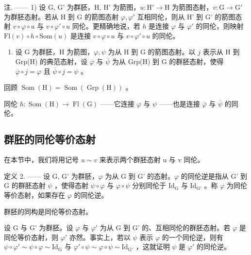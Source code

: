注. —— 1) 设 G, G' 为群胚，H, H' 为箭图，\(u\colon\mathrm{H}'\to\mathrm{H}\) 为箭图态射，\(v\colon\mathrm{G}\to\mathrm{G}'\) 为群胚态射。若从 H 到 G 的箭图态射 \(\varphi,\varphi'\) 互相同伦，则从 H' 到 G' 的箭图态射 \(v\circ\varphi\circ u\) 与 \(v\circ\varphi'\circ u\) 同伦。更精确地说，若 \(h\) 是连接 \(\varphi\) 与 \(\varphi'\) 的同伦，则映射 \(\mathrm{Fl}(v)\circ h\circ\mathrm{Som}(u)\) 是连接 \(v\circ\varphi\circ u\) 与 \(v\circ\varphi'\circ u\) 的同伦。

\begin{enumerate}
\def\labelenumi{\arabic{enumi})}
\setcounter{enumi}{1}
\tightlist
\item
  设 G 为群胚，H 为箭图，\(\varphi, \psi\) 为从 H 到 G 的箭图态射。以 \(j\) 表示从 H 到 Grp(H) 的典范态射，设 \(\overline{\varphi}\) 与 \(\overline{\psi}\) 为从 Grp(H) 到 G 的群胚态射，使得 \(\overline{\varphi} \circ j = \varphi\) 且 \(\overline{\psi} \circ j = \psi\) 。
\end{enumerate}

回顾 \(\operatorname{Som}(\mathrm{H}) = \operatorname{Som}(\operatorname{Grp}(\mathrm{H}))\) 。

同伦 \(h\colon \operatorname{Som}(\mathrm{H})\to \operatorname{Fl}(\mathrm{G})\) ——它连接 \(\varphi\) 与 \(\psi\) ——也是连接 \(\overline{\varphi}\) 与 \(\overline{\psi}\) 的同伦。

\subsection{群胚的同伦等价态射}

在本节中，我们将用记号 \(u \sim v\) 来表示两个群胚态射 u 与 v 同伦。

定义 2. —— 设 G, G' 为群胚，\(\varphi\) 为从 G 到 G' 的态射。\(\varphi\) 的同伦逆是指从 G' 到 G 的群胚态射 \(\psi\) ，使得态射 \(\psi \circ \varphi\) 与 \(\varphi \circ \psi\) 分别同伦于 \(\mathrm{Id}_{\mathrm{G}}\) 与 \(\mathrm{Id}_{\mathrm{G}'}\) 。称 \(\varphi\) 为同伦等价态射，如果存在 \(\varphi\) 的同伦逆。

群胚的同构是同伦等价态射。

设 G 与 G' 为群胚。设 \(\varphi\) 与 \(\varphi'\) 为从 G 到 G' 的、互相同伦的群胚态射。若 \(\varphi\) 是同伦等价态射，则 \(\varphi'\) 亦然。事实上，若以 \(\psi\) 表示 \(\varphi\) 的一个同伦逆，则有 \(\psi \circ \varphi' \sim \psi \circ \varphi \sim \mathrm{Id}_{\mathrm{G}}\) 与 \(\varphi' \circ \psi \sim \varphi \circ \psi \sim \mathrm{Id}_{\mathrm{G}'}\) ，这就证明 \(\psi\) 是 \(\varphi'\) 的同伦逆。

